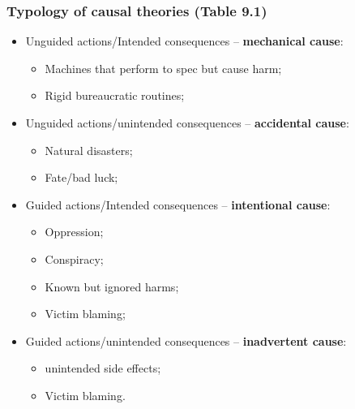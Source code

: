 \documentclass[aspectratio=169]{beamer}
\theoremstyle{principle}
\begin{document}
\begin{frame}
\frametitle{Typology of causal theories (Table 9.1)}
\begin{itemize}
\item Unguided actions/Intended consequences -- \textbf{mechanical cause}:
\begin{itemize}
\item Machines that perform to spec but cause harm;
\item Rigid bureaucratic routines;
\end{itemize}
\bigskip
\item Unguided actions/unintended consequences -- \textbf{accidental cause}:
\begin{itemize}
\item Natural disasters;
\item Fate/bad luck;
\end{itemize}
\bigskip
\item Guided actions/Intended consequences -- \textbf{intentional cause}:
\begin{itemize}
\item Oppression;
\item Conspiracy;
\item Known but ignored harms;
\item Victim blaming;
\end{itemize}
\bigskip
\item Guided actions/unintended consequences -- \textbf{inadvertent cause}:
\begin{itemize}
\item unintended side effects;
\item Victim blaming.
\end{itemize}
\end{itemize}
\end{frame}
\end{document}
